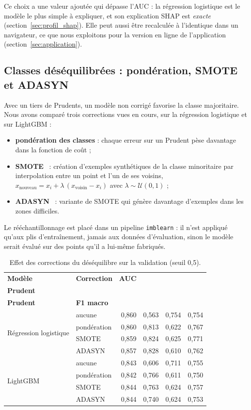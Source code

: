 Ce choix a une valeur ajoutée qui dépasse l'AUC : la régression logistique est le modèle le plus simple à expliquer, et son explication SHAP est \emph{exacte} (section~\ref{sec:profil_shap}). Elle peut aussi être recalculée à l'identique dans un navigateur, ce que nous exploitons pour la version en ligne de l'application (section~\ref{sec:application}).

\subsection{Classes déséquilibrées : pondération, SMOTE et ADASYN}

Avec un tiers de Prudents, un modèle non corrigé favorise la classe majoritaire. Nous avons comparé trois corrections vues en cours, sur la régression logistique et sur LightGBM :
\begin{itemize}
  \item \textbf{pondération des classes} : chaque erreur sur un Prudent pèse davantage dans la fonction de coût ;
  \item \textbf{SMOTE}~\cite{chawla2002} : création d'exemples synthétiques de la classe minoritaire par interpolation entre un point et l'un de ses voisins, $x_{\text{nouveau}} = x_i + \lambda\,(x_{\text{voisin}} - x_i)$ avec $\lambda \sim \mathcal{U}(0,1)$ ;
  \item \textbf{ADASYN}~\cite{he2008} : variante de SMOTE qui génère davantage d'exemples dans les zones difficiles.
\end{itemize}
Le rééchantillonnage est placé dans un pipeline \texttt{imblearn} : il n'est appliqué qu'aux plis d'entraînement, jamais aux données d'évaluation, sinon le modèle serait évalué sur des points qu'il a lui-même fabriqués.

\begin{table}[!htb]
  \centering
  \small
  \caption{Effet des corrections du déséquilibre sur la validation (seuil 0,5).}
  \label{tab:desequilibre}
  \begin{tabular}{@{}l l r r r r@{}}
    \toprule
    \textbf{Modèle} & \textbf{Correction} & \textbf{AUC} & \shortstack[r]{\textbf{Rappel}\\\textbf{Prudent}} & \shortstack[r]{\textbf{Précision}\\\textbf{Prudent}} & \textbf{F1 macro} \\
    \midrule
    \multirow{4}{*}{Régression logistique} & aucune & 0,860 & 0,563 & 0,754 & 0,754 \\
     & pondération & 0,860 & 0,813 & 0,622 & 0,767 \\
     & SMOTE & 0,859 & 0,824 & 0,625 & 0,771 \\
     & ADASYN & 0,857 & 0,828 & 0,610 & 0,762 \\
    \midrule
    \multirow{4}{*}{LightGBM} & aucune & 0,843 & 0,606 & 0,711 & 0,755 \\
     & pondération & 0,842 & 0,766 & 0,611 & 0,750 \\
     & SMOTE & 0,844 & 0,763 & 0,624 & 0,757 \\
     & ADASYN & 0,844 & 0,740 & 0,624 & 0,753 \\
    \bottomrule
  \end{tabular}
\end{table}

